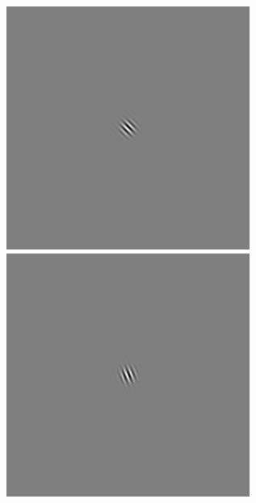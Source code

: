 \begin{figure}[ht]
\begin{center}
 \includegraphics[width=\columnwidth/9]{ch4/figures/iGabor0_6.jpg}
 \includegraphics[width=\columnwidth/9]{ch4/figures/iGabor0_7.jpg}\\

\end{center}
\end{figure}
